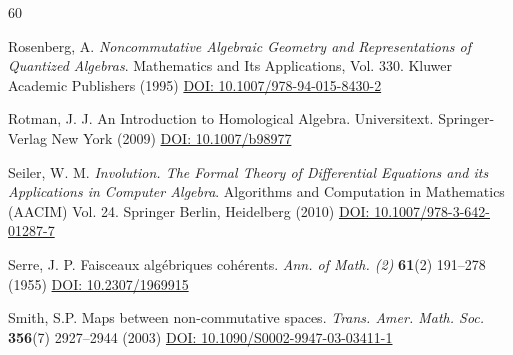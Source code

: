 \documentclass[reqno]{amsart}
\theoremstyle{definition}
\theoremstyle{remark}
\numberwithin{equation}{section}
\begin{document}
\begin{thebibliography}{60}

 Rosenberg, A. {\em Noncommutative Algebraic Geometry and Representations of Quantized Algebras}. Mathematics and Its Applications, Vol. 330. Kluwer Academic Publishers (1995) \linebreak  \href{https://doi.org/10.1007/978-94-015-8430-2}{DOI: 10.1007/978-94-015-8430-2}

 Rotman, J. J. An Introduction to Homological Algebra. Universitext. Springer-Verlag New York (2009) \href{https://doi.org/10.1007/b98977}{DOI: 10.1007/b98977}


 Seiler, W. M. {\em Involution. {T}he {F}ormal {T}heory of {D}ifferential {E}quations and its {A}pplications in {C}omputer {A}lgebra}. Algorithms and Computation in Mathematics (AACIM) Vol. 24. Springer Berlin, Heidelberg (2010) \href{https://doi.org/10.1007/978-3-642-01287-7}{DOI: 10.1007/978-3-642-01287-7}

 Serre, J. P. Faisceaux alg{\'e}briques coh{\'e}rents. {\em Ann. of Math. (2)} {\bf 61}(2) 191--278 (1955) \href{https://doi.org/10.2307/1969915}{DOI: 10.2307/1969915}



 Smith, S.P. Maps between non-commutative spaces. {\em Trans. Amer. Math. Soc.} {\bf 356}(7) 2927--2944 (2003) \href{https://doi.org/10.1090/S0002-9947-03-03411-1}{DOI: 10.1090/S0002-9947-03-03411-1}


\end{thebibliography}
\end{document}
